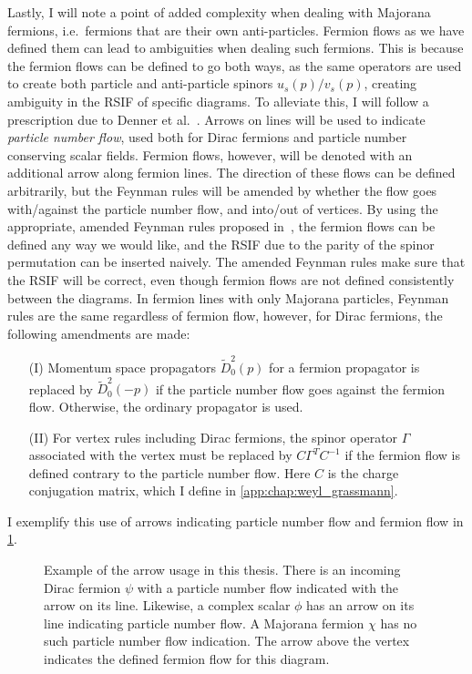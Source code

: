 \documentclass[../main.tex]{subfiles}
\begin{document}
Lastly, I will note a point of added complexity when dealing with Majorana fermions, i.e.\ fermions that are their own anti-particles.
Fermion flows as we have defined them can lead to ambiguities when dealing such fermions.
This is because the fermion flows can be defined to go both ways, as the same operators are used to create both particle and anti-particle spinors \(u_s(p)/v_s(p)\), creating ambiguity in the RSIF of specific diagrams.
To alleviate this, I will follow a prescription due to Denner et al.~\cite{Denner:1992vza}.
Arrows on lines will be used to indicate \emph{particle number flow}, used both for Dirac fermions and particle number conserving scalar fields.
Fermion flows, however, will be denoted with an additional arrow along fermion lines.
The direction of these flows can be defined arbitrarily, but the Feynman rules will be amended by whether the flow goes with/against the particle number flow, and into/out of vertices.
By using the appropriate, amended Feynman rules proposed in~\cite{Denner:1992vza}, the fermion flows can be defined any way we would like, and the RSIF due to the parity of the spinor permutation can be inserted naively.
The amended Feynman rules make sure that the RSIF will be correct, even though fermion flows are not defined consistently between the diagrams.
In fermion lines with only Majorana particles, Feynman rules are the same regardless of fermion flow, however, for Dirac fermions, the following amendments are made:
\begin{itemize}
  \item [(I)] Momentum space propagators \(\tilde{D}_0^2(p)\) for a fermion propagator is replaced by \(\tilde{D}_0^2(-p)\) if the particle number flow goes against the fermion flow. Otherwise, the ordinary propagator is used.
  \item [(II)] For vertex rules including Dirac fermions, the spinor operator \(\Gamma\) associated with the vertex must be replaced by \(C\Gamma^T C^{-1}\) if the fermion flow is defined contrary to the particle number flow. Here \(C\) is the charge conjugation matrix, which I define in \cref{app:chap:weyl_grassmann}.
\end{itemize}

I exemplify this use of arrows indicating particle number flow and fermion flow in \cref{qft:fig:feynman_flow}.

\begin{figure}[ht!]
  \centering
  \caption{Example of the arrow usage in this thesis.
    There is an incoming Dirac fermion \(\psi\) with a particle number flow indicated with the arrow on its line.
    Likewise, a complex scalar \(\phi\) has an arrow on its line indicating particle number flow.
    A Majorana fermion \(\chi\) has no such particle number flow indication.
    The arrow above the vertex indicates the defined fermion flow for this diagram.}
  \label{qft:fig:feynman_flow}
\end{figure}
\end{document}
